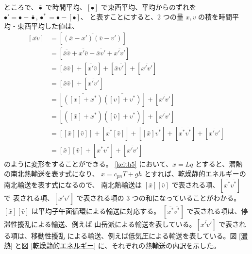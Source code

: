 \documentclass[body]{subfiles}
\begin{document}
ところで、\(\bar\bullet\) で時間平均、\([\bullet]\) で東西平均、平均からのずれを
\(\bullet'=\bullet-\bar\bullet, \bullet^*=\bullet-[\bullet]\)、
と表すことにすると、2 つの量 \(x,v\) の積を時間平均・東西平均した値は、
\begin{equation}
	\begin{split}
		[\overline{xv}]&=[\overline{(\bar x-x')(\bar v-v')}]\\
		&=[\overline{\bar x\bar v}+\overline{x'\bar v}+\overline{\bar xv'}+\overline{x'v'}]\\
		&=[\bar x\bar v]+[\bar{x'}\bar v]+[\bar x\bar{v'}]+[\overline{x'v'}]\\
		&=[\bar x\bar v]+[\overline{x'v'}]\\
		&=[\overline{([x]+x^*)}\overline{([v]+v^*)}]+[\overline{x'v'}]\\
		&=[([\bar x]+\bar{x^*})([\bar v]+\bar{v^*})]+[\overline{x'v'}]\\
		&=[[\bar x][\bar v]]+[\bar{x^*}[\bar v]]+[[\bar x]\bar{v^*}]+[\bar{x^*}\bar{v^*}]+[\overline{x'v'}]\\
		&=[\bar x][\bar v]+[\bar{x^*}\bar{v^*}]+[\overline{x'v'}]
	\end{split}\label{keith5}
\end{equation}
のように変形をすることができる。
\eqref{keith5} において、\(x=Lq\) とすると、潜熱の南北熱輸送を表す式になり、
\(x=c_{pn}T+gh\) とすれば、乾燥静的エネルギーの南北輸送を表す式になるので、
南北熱輸送は \([\bar x][\bar v]\) で表される項、\([\bar{x^*}\bar{v^*}]\) で
表される項、\([\overline{x'v'}]\) で表される項の 3 つの和になっていることがわかる。
\([\bar x][\bar v]\) は平均子午面循環による輸送に対応する。
\([\bar{x^*}\bar{v^*}]\) で表される項は、停滞性擾乱による輸送、例えば
山岳派による輸送を表している。\([\overline{x'v'}]\) で表される項は、移動性擾乱
による輸送、例えば低気圧による輸送を表している。図 \ref{潜熱} と図
\ref{乾燥静的エネルギー} に、それぞれの熱輸送の内訳を示した。
\end{document}
